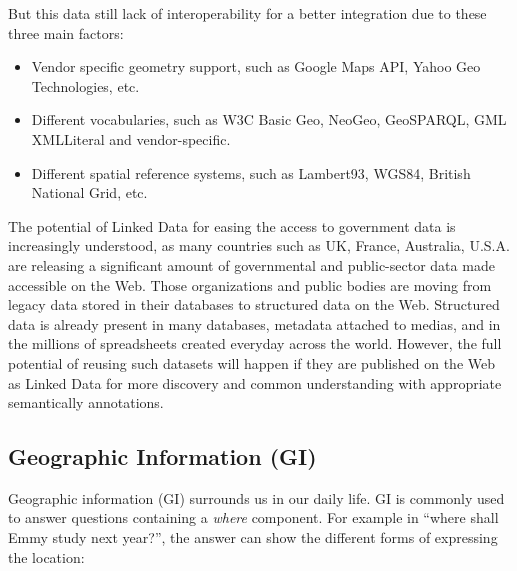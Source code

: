  
But this data still lack of interoperability for a better integration due to these three main factors:
\begin{itemize}
\item Vendor specific geometry support, such as Google Maps API, Yahoo Geo Technologies, etc.
\item Different vocabularies, such as W3C Basic Geo, NeoGeo, GeoSPARQL, GML XMLLiteral and vendor-specific.
\item Different spatial reference systems, such as Lambert93, WGS84, British National Grid, etc.
\end{itemize}

The potential of Linked Data for easing the access to government data is increasingly understood, as many countries such as UK, France, Australia, U.S.A. are releasing a significant amount of governmental and public-sector data made accessible on the Web. Those organizations and public bodies are moving from legacy data stored in their databases to structured data on the Web. Structured data is already present in many databases, metadata attached to medias, and in the millions of spreadsheets created everyday across the world. However, the full potential of reusing such datasets will happen if they are published on the Web as Linked Data for more discovery and common understanding with appropriate semantically annotations.

\subsection{Geographic Information (GI)}
\label{sec:geoinfo}

Geographic information (GI) surrounds us in our daily life. GI is commonly used to answer questions containing a \textit{where} component. For example in ``where shall Emmy study next year?'', the answer can show the different forms of expressing the location:


